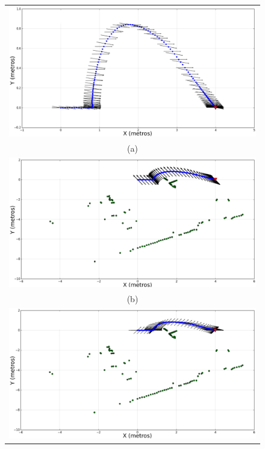 \begin{figure}
  \centering
    \begin{tabular}{c}
      \multicolumn{1}{c}{\includegraphics[width=.80\textwidth]{images/fattr_lidar_s.eps}}\\
      \multicolumn{1}{c}{(a)}\\
      \multicolumn{1}{c}{\includegraphics[width=.80\textwidth]{images/frep_lidar_s.eps}}\\
      \multicolumn{1}{c}{(b)}\\
      \multicolumn{1}{c}{\includegraphics[width=.80\textwidth]{images/fnav_lidar_s.eps}}\\

\end{tabular}
\end{figure}
